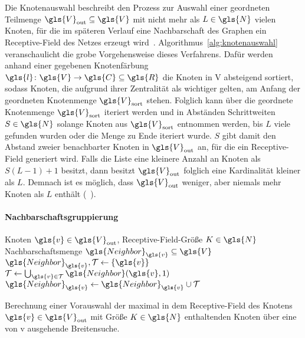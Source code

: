 Die Knotenauswahl beschreibt den Prozess zur Auswahl einer geordneten Teilmenge $\gls{V}_{\mathrm{out}} \subseteq \gls{V}$ mit nicht mehr als $L \in \gls{N}$ vielen Knoten, für die im späteren Verlauf eine Nachbarschaft des Graphen \bzw{} ein Receptive-Field des Netzes erzeugt wird~\cite{patchy}.
Algorithmus~\ref{alg:knotenauswahl} veranschaulicht die grobe Vorgehensweise dieses Verfahrens.
Dafür werden anhand einer gegebenen Knotenfärbung $\gls{l} \colon \gls{V} \to \gls{C} \subseteq \gls{R}$ die Knoten in \gls{V} absteigend sortiert, sodass Knoten, die aufgrund ihrer Zentralität als wichtiger gelten, am Anfang der geordneten Knotenmenge $\gls{V}_{\mathrm{sort}}$ stehen.
Folglich kann über die geordnete Knotenmenge $\gls{V}_{\mathrm{sort}}$ iteriert werden und in Abständen \bzw{} Schrittweiten $S \in \gls{N}$ solange Knoten aus $\gls{V}_{\mathrm{sort}}$ entnommen werden, bis $L$ viele gefunden wurden oder die Menge zu Ende iteriert wurde.
$S$ gibt damit den Abstand zweier benachbarter Knoten in $\gls{V}_{\mathrm{out}}$ an, für die ein Receptive-Field generiert wird.
Falls die Liste eine kleinere Anzahl an Knoten als $S\left( L -1 \right) + 1$ besitzt, dann besitzt $\gls{V}_{\mathrm{out}}$ folglich eine Kardinalität kleiner als $L$.
Demnach ist es möglich, dass $\gls{V}_{\mathrm{out}}$ weniger, aber niemals mehr Knoten als $L$ enthält (\vgl{}~\cite{patchy}).

\paragraph{Nachbarschaftsgruppierung}
\label{nachbarschaftsgruppierung}

\begin{algorithm}[t]
\centering
\begin{algorithmic}
  \REQUIRE{} Knoten $\gls{v} \in \gls{V}_{\mathrm{out}}$, Receptive-Field-Größe $K \in \gls{N}$
  \ENSURE{} Nachbarschaftsmenge $\gls{Neighbor}_{\gls{v}} \subseteq \gls{V}$
  \STATE{} $\gls{Neighbor}_{\gls{v}}, \mathcal{T} \leftarrow \left\{\gls{v}\right\}$
    \STATE{} $\mathcal{T} \leftarrow \bigcup_{\gls{v} \in \mathcal{T}} \gls{Neighbor}\left(\gls{v}, 1\right)$
    \STATE{} $\gls{Neighbor}_{\gls{v}} \leftarrow \gls{Neighbor}_{\gls{v}} \cup \mathcal{T}$
  \ENDWHILE{}
\end{algorithmic}
\caption[Nachbarschaftsgruppierung]{Berechnung einer Vorauswahl der maximal in dem Receptive-Field des Knotens $\gls{v} \in \gls{V}_{\mathrm{out}}$ mit Größe $K \in \gls{N}$ enthaltenden Knoten über eine von \gls{v} ausgehende Breitensuche.}
\label{alg:nachbarschaftsgruppierung}
\end{algorithm}


